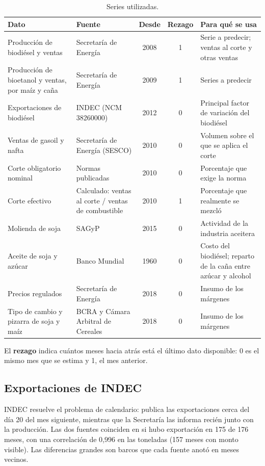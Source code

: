 \documentclass[11pt,a4paper]{article}
\begin{document}
\begin{table}[htbp]
\centering\footnotesize
\begin{tabularx}{\textwidth}{@{}P{3.6cm}P{3.4cm}ccL@{}}
\toprule
\textbf{Dato} & \textbf{Fuente} & \textbf{Desde} & \textbf{Rezago} & \textbf{Para qué se usa}\\
\midrule
Producción de biodiésel y ventas & Secretaría de Energía & 2008 & 1 & Serie a predecir; ventas al corte y otras ventas\\
Producción de bioetanol y ventas, por maíz y caña & Secretaría de Energía & 2009 & 1 & Series a predecir\\
Exportaciones de biodiésel & INDEC (NCM 38260000) & 2012 & 0 & Principal factor de variación del biodiésel\\
Ventas de gasoil y nafta & Secretaría de Energía (SESCO) & 2010 & 0 & Volumen sobre el que se aplica el corte\\
Corte obligatorio nominal & Normas publicadas & 2010 & 0 & Porcentaje que exige la norma\\
Corte efectivo & Calculado: ventas al corte / ventas de combustible & 2010 & 1 & Porcentaje que realmente se mezcló\\
Molienda de soja & SAGyP & 2015 & 0 & Actividad de la industria aceitera\\
Aceite de soja y azúcar & Banco Mundial & 1960 & 0 & Costo del biodiésel; reparto de la caña entre azúcar y alcohol\\
Precios regulados & Secretaría de Energía & 2018 & 0 & Insumo de los márgenes\\
Tipo de cambio y pizarra de soja y maíz & BCRA y Cámara Arbitral de Cereales & 2018 & 0 & Insumo de los márgenes\\
\bottomrule
\end{tabularx}
\caption{Series utilizadas.}
\end{table}

El \textbf{rezago} indica cuántos meses hacia atrás está el último dato disponible: 0 es el mismo mes que se estima y 1, el mes anterior.

\subsection{Exportaciones de INDEC}

INDEC resuelve el problema de calendario: publica las exportaciones cerca del día 20 del mes siguiente, mientras que la Secretaría las informa recién junto con la producción. Las dos fuentes coinciden en si hubo exportación en 175 de 176 meses, con una correlación de 0,996 en las toneladas (157 meses con monto visible). Las diferencias grandes son barcos que cada fuente anotó en meses vecinos.
\end{document}
